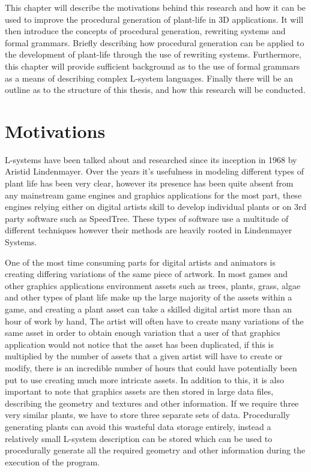 This chapter will describe the motivations behind this research and how it can be used to improve the procedural generation of plant-life in 3D applications. It will then introduce the concepts of procedural generation, rewriting systems and formal grammars. Briefly describing how procedural generation can be applied to the development of plant-life through the use of rewriting systems. Furthermore, this chapter will provide sufficient background as to the use of formal grammars as a means of describing complex L-system languages. Finally there will be an outline as to the structure of this thesis, and how this research will be conducted.

\section{Motivations}

L-systems have been talked about and researched since its inception in 1968 by Aristid Lindenmayer. Over the years it's usefulness in modeling different types of plant life has been very clear, however its presence has been quite absent from any mainstream game engines and graphics applications for the most part, these engines relying either on digital artists skill to develop individual plants or on 3rd party software such as SpeedTree. These types of software use a multitude of different techniques however their methods are heavily rooted in Lindenmayer Systems. 
 
One of the most time consuming parts for digital artists and animators is creating differing variations of the same piece of artwork. In most games and other graphics applications environment assets such as trees, plants, grass, algae and other types of plant life make up the large majority of the assets within a game, and creating a plant asset can take a skilled digital artist more than an hour of work by hand, The artist will often have to create many variations of the same asset in order to obtain enough variation that a user of that graphics application would not notice that the asset has been duplicated, if this is multiplied by the number of assets that a given artist will have to create or modify, there is an incredible number of hours that could have potentially been put to use creating much more intricate assets. In addition to this, it is also important to note that graphics assets are then stored in large data files, describing the geometry and textures and other information. If we require three very similar plants, we have to store three separate sets of data. Procedurally generating plants can avoid this wasteful data storage entirely, instead a relatively small L-system description can be stored which can be used to procedurally generate all the required geometry and other information during the execution of the program.\\

